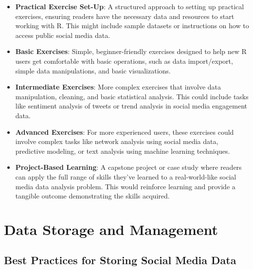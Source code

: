 \documentclass[
]{book}
\providecommand{\tightlist}{%
  \setlength{\itemsep}{0pt}\setlength{\parskip}{0pt}}
\begin{document}
\begin{itemize}
\tightlist
\item
  \textbf{Practical Exercise Set-Up}: A structured approach to setting up practical exercises, ensuring readers have the necessary data and resources to start working with R. This might include sample datasets or instructions on how to access public social media data.
\item
  \textbf{Basic Exercises}: Simple, beginner-friendly exercises designed to help new R users get comfortable with basic operations, such as data import/export, simple data manipulations, and basic visualizations.
\item
  \textbf{Intermediate Exercises}: More complex exercises that involve data manipulation, cleaning, and basic statistical analysis. This could include tasks like sentiment analysis of tweets or trend analysis in social media engagement data.
\item
  \textbf{Advanced Exercises}: For more experienced users, these exercises could involve complex tasks like network analysis using social media data, predictive modeling, or text analysis using machine learning techniques.
\item
  \textbf{Project-Based Learning}: A capstone project or case study where readers can apply the full range of skills they've learned to a real-world-like social media data analysis problem. This would reinforce learning and provide a tangible outcome demonstrating the skills acquired.
\end{itemize}

\hypertarget{data-storage-and-management}{%
\chapter{Data Storage and Management}\label{data-storage-and-management}}

\hypertarget{best-practices-for-storing-social-media-data}{%
\section*{Best Practices for Storing Social Media Data}\label{best-practices-for-storing-social-media-data}}
\end{document}
